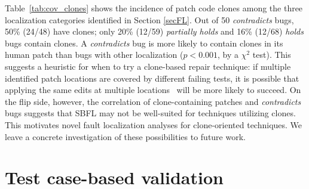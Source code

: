\documentclass[10pt,journal,compsoc]{IEEEtran}
\begin{document}
Table~\ref{tab:cov_clones} shows the incidence of patch code clones among the three 
localization categories identified in Section \ref{secFL}. 
Out of 50 \emph{contradicts} bugs, 50\% (24/48) have clones; only 
20\% (12/59) \emph{partially holds} and 16\% (12/68)
\emph{holds} bugs contain clones.
A \emph{contradicts} bug is more likely to contain clones in its
human patch than bugs with other localization  ($p < 0.001$, by a $\chi^2$ test).
This suggests a heuristic for when to try a clone-based repair technique:
if multiple identified patch locations are covered by different failing tests,
it is possible that
applying the same edits at multiple locations~\cite{saha2019harnessing} will be
more likely to succeed. On the flip
side, however, the correlation of clone-containing patches and \emph{contradicts} bugs
suggests that SBFL may not be well-suited for techniques utilizing clones.
This motivates novel fault localization analyses for
clone-oriented techniques.   We
leave a concrete investigation of these possibilities to future work.  


\section{Test case-based validation}
\label{sec:tests}
\end{document}
